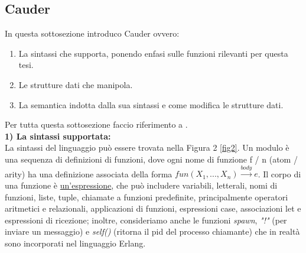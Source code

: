 \documentclass[background.tex]{subfiles}
\begin{document}
\subsection{Cauder}
In questa sottosezione introduco Cauder ovvero: 
	\begin{enumerate}
		\item La sintassi che supporta, ponendo enfasi sulle funzioni rilevanti per questa tesi.
		\item Le strutture dati che manipola.
		\item La semantica indotta dalla sua sintassi e come modifica le strutture dati.
	\end{enumerate}
Per tutta questa sottosezione faccio riferimento a \cite{lanese19}.\\
\textbf{1) La sintassi supportata:}\\
La sintassi del linguaggio può essere trovata nella Figura 2 \ref{fig2}. Un modulo è una sequenza di definizioni di funzioni, dove ogni nome di funzione f / n (atom / arity) ha una definizione associata della forma $\displaystyle fun (X_{1},..., X_{n}) \xrightarrow{body} e$.
Il corpo di una funzione è \underline{un'espressione}, che può includere variabili, letterali, nomi di funzioni, liste, tuple, chiamate a funzioni predefinite, principalmente operatori aritmetici e relazionali, applicazioni di funzioni, espressioni case, associazioni let e espressioni di ricezione; inoltre, consideriamo anche le funzioni \textit{spawn}, \textit{"!"} (per inviare un messaggio) e \textit{self()} (ritorna il pid del processo chiamante) che in realtà sono incorporati nel linguaggio Erlang.
\end{document}
